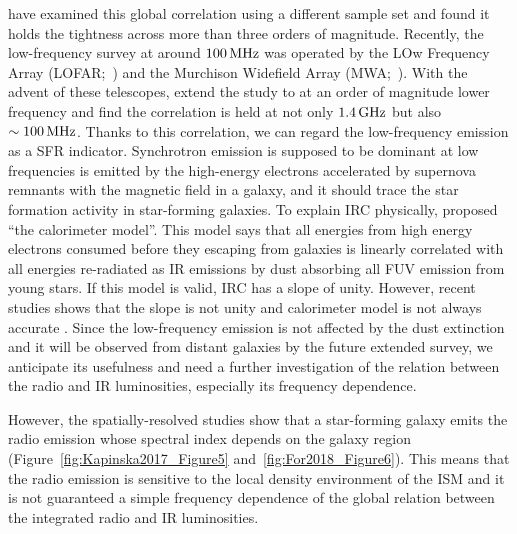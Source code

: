 \citet{Condon1991a,Yun2001a, Bell2003} have examined this global correlation using a different sample set and found it holds the tightness across more than three orders of magnitude.
Recently, the low-frequency survey at around $100\,\mathrm{MHz}$ was operated by the LOw Frequency Array (LOFAR;~\citealt{VanHaarlem2013}) and the Murchison Widefield Array (MWA;~\citealt{Tingay2013a}).
With the advent of these telescopes, \citet{CalistroRivera2017a, Read2018, Wang2019} extend the study to at an order of magnitude lower frequency and find the correlation is held at not only $1.4\,\mathrm{GHz}$ but also $\sim 100\,\mathrm{MHz}$.
Thanks to this correlation, we can regard the low-frequency emission as a SFR indicator.
Synchrotron emission is supposed to be dominant at low frequencies is emitted by the high-energy electrons accelerated by supernova remnants with the magnetic field in a galaxy, and it should trace the star formation activity in star-forming galaxies.
To explain IRC physically, \citet{Volk1989} proposed ``the calorimeter model''.
This model says that all energies from high energy electrons consumed before they escaping from galaxies is linearly correlated with all energies re-radiated as IR emissions by dust absorbing all FUV emission from young stars.
If this model is valid, IRC has a slope of unity.
However, recent studies shows that the slope is not unity and calorimeter model is not always accurate \citep{CalistroRivera2017a, Read2018}.
Since the low-frequency emission is not affected by the dust extinction \citep{Yun2001a, Murphy2011} and it will be observed from distant galaxies by the future extended survey, we anticipate its usefulness and need a further investigation of the relation between the radio and IR luminosities, especially its frequency dependence.

However, the spatially-resolved studies show that a star-forming galaxy emits the radio emission whose spectral index depends on the galaxy region \citep{Kapinska2017a, For2018a, Heesen2019} (Figure~\ref{fig:Kapinska2017_Figure5} and~\ref{fig:For2018_Figure6}).
This means that the radio emission is sensitive to the local density environment of the ISM and it is not guaranteed a simple frequency dependence of the global relation between the integrated radio and IR luminosities.

